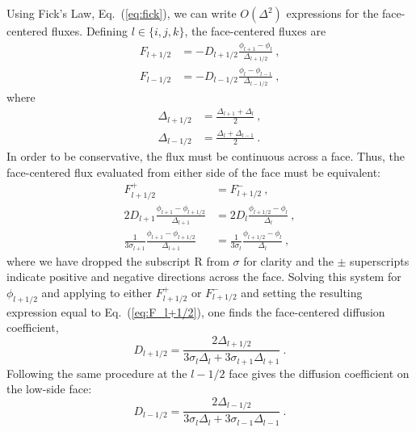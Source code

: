 \documentclass[preprint,12pt]{elsarticle}
\begin{document}
Using Fick's Law, Eq.~(\ref{eq:fick}), we can write $O(\Delta^2)$ expressions
for the face-centered fluxes.  Defining $l\in\{i,j,k\}$, the face-centered
fluxes are
\begin{align}
  F_{l+1/2} &= -D_{l+1/2}\frac{\phi_{l+1} -
    \phi_{l}}{\Delta_{l+1/2}}\:, \label{eq:F_l+1/2}\\ F_{l-1/2} &=
  -D_{l-1/2}\frac{\phi_{l} -
    \phi_{l-1}}{\Delta_{l-1/2}}\:, \label{eq:F_l-1/2}
\end{align}
where
\begin{align}
  \Delta_{l+1/2} &= \frac{\Delta_{l+1} +
    \Delta_{l}}{2}\:,\\ \Delta_{l-1/2} &= \frac{\Delta_{l} +
    \Delta_{l-1}}{2}\:.
\end{align}
In order to be conservative, the flux must be continuous across a face.  Thus,
the face-centered flux evaluated from either side of the face must be
equivalent:
\begin{equation}
  \begin{aligned}
    F_{l+1/2}^{+} &= F_{l+1/2}^{-}\:,\\ 2D_{l+1}\frac{\phi_{l+1} -
      \phi_{l+1/2}}{\Delta_{l+1}} &= 2D_{l}\frac{\phi_{l+1/2} -
      \phi_{l}}{\Delta_l}\:,\\ \frac{1}{3\sigma_{l+1}}\frac{\phi_{l+1}
      - \phi_{l+1/2}}{\Delta_{l+1}} &=
    \frac{1}{3\sigma_{l}}\frac{\phi_{l+1/2} - \phi_{l}}{\Delta_l}\:,
  \end{aligned}
\end{equation}
where we have dropped the subscript $\mathrm{R}$ from $\sigma$ for clarity and
the $\pm$ superscripts indicate positive and negative directions across the
face.  Solving this system for $\phi_{l+1/2}$ and applying to either
$F_{l+1/2}^{+}$ or $F_{l+1/2}^{-}$ and setting the resulting expression equal
to Eq.~(\ref{eq:F_l+1/2}), one finds the face-centered diffusion coefficient,
\begin{equation}
  D_{l+1/2} = \frac{2\Delta_{l+1/2}}{3\sigma_l\Delta_l +
    3\sigma_{l+1}\Delta_{l+1}}\:.
  \label{eq:D_l+1/2}
\end{equation}
Following the same procedure at the $l-1/2$ face gives the diffusion
coefficient on the low-side face:
\begin{equation}
  D_{l-1/2} = \frac{2\Delta_{l-1/2}}{3\sigma_l\Delta_l +
    3\sigma_{l-1}\Delta_{l-1}}\:.
  \label{eq:D_l-1/2}
\end{equation}
\end{document}

